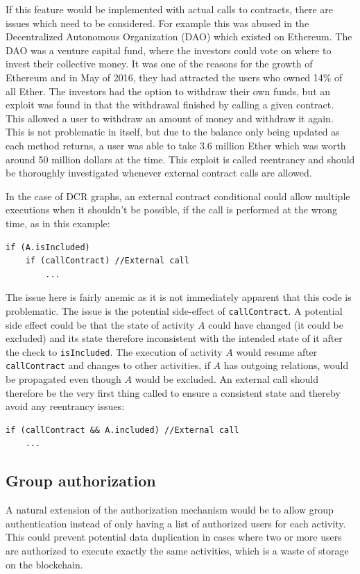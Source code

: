 \documentclass{article}
\begin{document}
			If this feature would be implemented with actual calls to contracts, there are issues which need to be considered. 
			For example this was abused in the Decentralized Autonomous Organization (DAO) which existed on Ethereum.			
			The DAO was a venture capital fund, where the investors could vote on where to invest their collective money.
			It was one of the reasons for the growth of Ethereum and in May of 2016, they had attracted the users who owned 14\% of all Ether\cite{DAO}. 
			The investors had the option to withdraw their own funds, but an exploit was found in that the withdrawal finished by calling a given contract.
			This allowed a user to withdraw an amount of money and withdraw it again.
			This is not problematic in itself, but due to the balance only being updated as each method returns, a user was able to take 3.6 million Ether which was worth around 50 million dollars at the time.
			This exploit is called reentrancy and should be thoroughly investigated whenever external contract calls are allowed.

			In the case of DCR graphs, an external contract conditional could allow multiple executions when it shouldn't be possible, if the call is performed at the wrong time, as in this example:

			\begin{lstlisting}[language=pseudocode]
if (A.isIncluded)
	if (callContract) //External call
		...
			\end{lstlisting}

			The issue here is fairly anemic as it is not immediately apparent that this code is problematic.
			The issue is the potential side-effect of \texttt{callContract}. 
			A potential side effect could be that the state of activity $A$ could have changed (it could be excluded) and its state therefore inconsistent with the intended state of it after the check to \texttt{isIncluded}.
			The execution of activity $A$ would resume after \texttt{callContract} and changes to other activities, if $A$ has outgoing relations, would be propagated even though $A$ would be excluded.  
			An external call should therefore be the very first thing called to ensure a consistent state and thereby avoid any reentrancy issues:

			\begin{lstlisting}[language=pseudocode]
if (callContract && A.included) //External call
	...
			\end{lstlisting}

		\subsection{Group authorization}
		A natural extension of the authorization mechanism would be to allow group authentication instead of only having a list of authorized users for each activity.
		This could prevent potential data duplication in cases where two or more users are authorized to execute exactly the same activities, which is a waste of storage on the blockchain.
\end{document}
